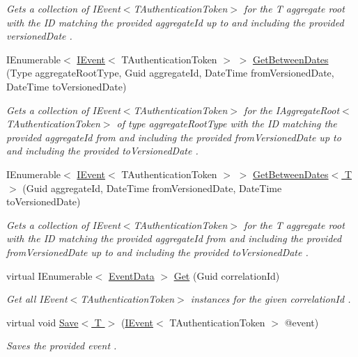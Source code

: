 \begin{DoxyCompactItemize}
\begin{DoxyCompactList}\small\item\em Gets a collection of I\+Event$<$\+T\+Authentication\+Token$>$ for the {\itshape T} aggregate root with the ID matching the provided {\itshape aggregate\+Id}  up to and including the provided {\itshape versioned\+Date} . \end{DoxyCompactList}\item 
I\+Enumerable$<$ \hyperlink{interfaceCqrs_1_1Events_1_1IEvent}{I\+Event}$<$ T\+Authentication\+Token $>$ $>$ \hyperlink{classCqrs_1_1Events_1_1InProcessEventStore_a74dd36fca8006f2c739b2675c677c1ec_a74dd36fca8006f2c739b2675c677c1ec}{Get\+Between\+Dates} (Type aggregate\+Root\+Type, Guid aggregate\+Id, Date\+Time from\+Versioned\+Date, Date\+Time to\+Versioned\+Date)
\begin{DoxyCompactList}\small\item\em Gets a collection of I\+Event$<$\+T\+Authentication\+Token$>$ for the I\+Aggregate\+Root$<$\+T\+Authentication\+Token$>$ of type {\itshape aggregate\+Root\+Type}  with the ID matching the provided {\itshape aggregate\+Id}  from and including the provided {\itshape from\+Versioned\+Date}  up to and including the provided {\itshape to\+Versioned\+Date} . \end{DoxyCompactList}\item 
I\+Enumerable$<$ \hyperlink{interfaceCqrs_1_1Events_1_1IEvent}{I\+Event}$<$ T\+Authentication\+Token $>$ $>$ \hyperlink{classCqrs_1_1Events_1_1InProcessEventStore_a07534ebbda76f4a40c1386866afe0f6d_a07534ebbda76f4a40c1386866afe0f6d}{Get\+Between\+Dates$<$ T $>$} (Guid aggregate\+Id, Date\+Time from\+Versioned\+Date, Date\+Time to\+Versioned\+Date)
\begin{DoxyCompactList}\small\item\em Gets a collection of I\+Event$<$\+T\+Authentication\+Token$>$ for the {\itshape T} aggregate root with the ID matching the provided {\itshape aggregate\+Id}  from and including the provided {\itshape from\+Versioned\+Date}  up to and including the provided {\itshape to\+Versioned\+Date} . \end{DoxyCompactList}\item 
virtual I\+Enumerable$<$ \hyperlink{classCqrs_1_1Events_1_1EventData}{Event\+Data} $>$ \hyperlink{classCqrs_1_1Events_1_1InProcessEventStore_a3d04ebb3354c7a5980b3a7e9586285fc_a3d04ebb3354c7a5980b3a7e9586285fc}{Get} (Guid correlation\+Id)
\begin{DoxyCompactList}\small\item\em Get all I\+Event$<$\+T\+Authentication\+Token$>$ instances for the given {\itshape correlation\+Id} . \end{DoxyCompactList}\item 
virtual void \hyperlink{classCqrs_1_1Events_1_1InProcessEventStore_a72dbd170c7e89e1a7bd313d2b3900c64_a72dbd170c7e89e1a7bd313d2b3900c64}{Save$<$ T $>$} (\hyperlink{interfaceCqrs_1_1Events_1_1IEvent}{I\+Event}$<$ T\+Authentication\+Token $>$ @event)
\begin{DoxyCompactList}\small\item\em Saves the provided {\itshape event} . \end{DoxyCompactList}\end{DoxyCompactItemize}
